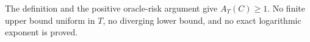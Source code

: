 The definition and the positive oracle-risk argument give \(A_T(C)\ge1\). No finite upper bound uniform in \(T\), no diverging lower bound, and no exact logarithmic exponent is proved.